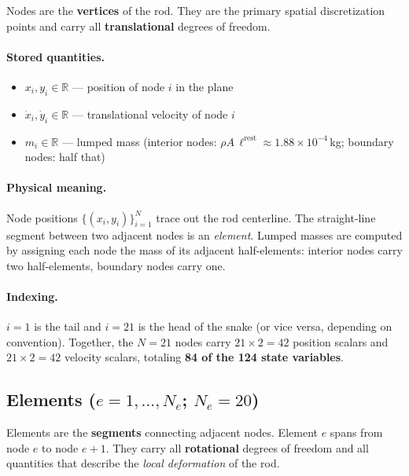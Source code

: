 \documentclass[11pt]{article}
\newcommand{\Real}{\mathbb{R}}
\begin{document}
Nodes are the \textbf{vertices} of the rod.
They are the primary spatial discretization points and carry all \textbf{translational} degrees of freedom.

\paragraph{Stored quantities.}
\begin{itemize}
  \item $x_i, y_i \in \Real$ --- position of node $i$ in the plane
  \item $\dot{x}_i, \dot{y}_i \in \Real$ --- translational velocity of node $i$
  \item $m_i \in \Real$ --- lumped mass (interior nodes: $\rho A \, \ell^{\text{rest}} \approx 1.88 \times 10^{-4}$\,kg; boundary nodes: half that)
\end{itemize}

\paragraph{Physical meaning.}
Node positions $\{(x_i, y_i)\}_{i=1}^{N}$ trace out the rod centerline.
The straight-line segment between two adjacent nodes is an \emph{element}.
Lumped masses are computed by assigning each node the mass of its adjacent half-elements: interior nodes carry two half-elements, boundary nodes carry one.

\paragraph{Indexing.}
$i = 1$ is the tail and $i = 21$ is the head of the snake (or vice versa, depending on convention).
Together, the $N = 21$ nodes carry $21 \times 2 = 42$ position scalars and $21 \times 2 = 42$ velocity scalars, totaling \textbf{84 of the 124 state variables}.

\subsection{Elements ($e = 1, \ldots, N_e$; $N_e = 20$)}

Elements are the \textbf{segments} connecting adjacent nodes.
Element $e$ spans from node $e$ to node $e+1$.
They carry all \textbf{rotational} degrees of freedom and all quantities that describe the \emph{local deformation} of the rod.
\end{document}
